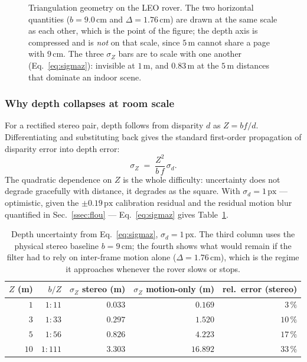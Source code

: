 \begin{figure}[htbp]
\caption{Triangulation geometry on the LEO rover. The two horizontal
quantities ($b = 9.0$\,cm and $\Delta = 1.76$\,cm) are drawn at the same
scale as each other, which is the point of the figure; the depth axis is
compressed and is \emph{not} on that scale, since $5$\,m cannot share a page
with $9$\,cm. The three $\sigma_Z$ bars are to scale with one another
(Eq.~\eqref{eq:sigmaz}): invisible at $1$\,m, and $0.83$\,m at the $5$\,m
distances that dominate an indoor scene.}
\label{fig:parallaxe}
\end{figure}

\subsubsection{Why depth collapses at room scale}

For a rectified stereo pair, depth follows from disparity $d$ as $Z = bf/d$.
Differentiating and substituting back gives the standard first-order
propagation of disparity error into depth error:
%
\begin{equation}
  \sigma_Z \;=\; \frac{Z^{2}}{b\,f}\,\sigma_d .
  \label{eq:sigmaz}
\end{equation}
%
The quadratic dependence on $Z$ is the whole difficulty: uncertainty does not
degrade gracefully with distance, it degrades as the square. With
$\sigma_d = 1\,\mathrm{px}$ --- optimistic, given the $\pm 0.19\,\mathrm{px}$
calibration residual and the residual motion blur quantified in
Sec.~\ref{ssec:flou} --- Eq.~\eqref{eq:sigmaz} gives Table~\ref{tab:sigmaz}.

\begin{table}[htbp]
\centering
\caption{Depth uncertainty from Eq.~\eqref{eq:sigmaz}, $\sigma_d = 1$\,px.
The third column uses the physical stereo baseline $b = 9$\,cm; the fourth
shows what would remain if the filter had to rely on inter-frame motion alone
($\Delta = 1.76$\,cm), which is the regime it approaches whenever the rover
slows or stops.}
\label{tab:sigmaz}
\begin{tabular}{rrrrr}
\hline
$Z$ (m) & $b/Z$ & $\sigma_Z$ stereo (m) & $\sigma_Z$ motion-only (m) & rel.\ error (stereo) \\
\hline
$1$  & $1{:}11$  & $0.033$ & $0.169$  & $3\,\%$ \\
$3$  & $1{:}33$  & $0.297$ & $1.520$  & $10\,\%$ \\
$5$  & $1{:}56$  & $0.826$ & $4.223$  & $17\,\%$ \\
$10$ & $1{:}111$ & $3.303$ & $16.892$ & $33\,\%$ \\
\hline
\end{tabular}
\end{table}

